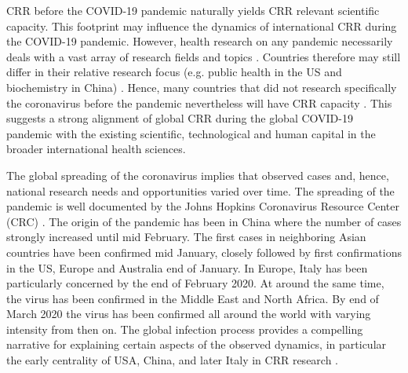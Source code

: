 CRR before the COVID-19 pandemic naturally yields CRR relevant scientific capacity. This footprint may influence the dynamics of international CRR during the COVID-19 pandemic. However, health research on any pandemic necessarily deals with a vast array of research fields and topics \citep{zhang2020scientific}. Countries therefore may still differ in their relative research focus (e.g. public health in the US and biochemistry in China) \citep{zhang2020scientific}. Hence, many countries that did not research specifically the coronavirus before the pandemic nevertheless will have CRR capacity \citep{lee2020strategy}. This suggests a strong alignment of global CRR during the global COVID-19 pandemic with the existing scientific, technological and human capital in the broader international health sciences. 

The global spreading of the coronavirus implies that observed cases and, hence, national research needs and opportunities varied over time. The spreading of the pandemic is well documented by the Johns Hopkins Coronavirus Resource Center (CRC) \citep{dong2020interactive}. The origin of the pandemic has been in China where the number of cases strongly increased until mid February. The first cases in neighboring Asian countries have been confirmed mid January, closely followed by first confirmations in the US, Europe and Australia end of January. In Europe, Italy has been particularly concerned by the end of February 2020. At around the same time, the virus has been confirmed in the Middle East and North Africa. By end of March 2020 the virus has been confirmed all around the world with varying intensity from then on.  The global infection process provides a compelling narrative for explaining certain aspects of the observed dynamics, in particular the early centrality of USA, China, and later Italy in CRR research \citep[as put forward in][]{fry2020consolidation}. 

